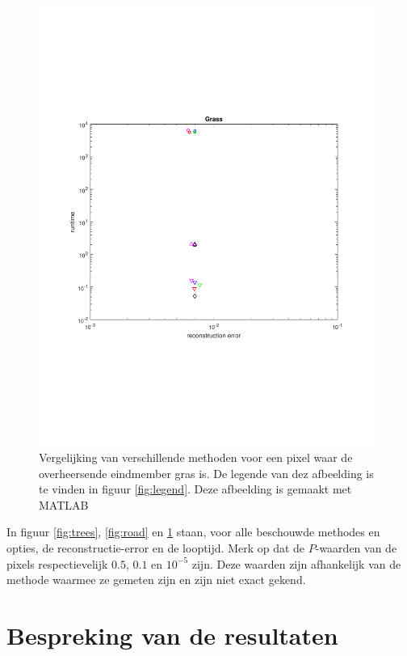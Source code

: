 \documentclass[12pt]{report}
\begin{document}
\begin{figure}
\includegraphics[width=0.99\textwidth,trim=0 200 0 175 cm]{plot_grass.pdf}
\caption{Vergelijking van verschillende methoden voor een pixel waar de overheersende eindmember gras is. De legende van dez afbeelding is te vinden in figuur \ref{fig:legend}. Deze afbeelding is gemaakt met MATLAB\cite{matlab} \label{fig:grass}}
\end{figure}



In figuur \ref{fig:trees}, \ref{fig:road} en \ref{fig:grass} staan, voor alle beschouwde methodes en opties, de reconstructie-error en de looptijd. Merk op dat de $P$-waarden van de pixels respectievelijk $0.5$, $0.1$ en $10^{-5}$ zijn. Deze waarden zijn afhankelijk van de methode waarmee ze gemeten zijn en zijn niet exact gekend. 

\section{Bespreking van de resultaten}
\end{document}
